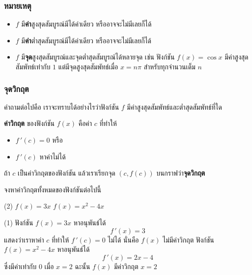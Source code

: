 \begin{frame}
\frametitle{หมายเหตุ}
\begin{remark}{}
\begin{itemize}
\item $f$ มี\textbf{ค่า}สูงสุดสัมบูรณ์มีได้ค่าเดียว หรืออาจจะไม่มีเลยก็ได้
\item $f$ มี\textbf{ค่า}ต่ำสุดสัมบูรณ์มีได้ค่าเดียว หรืออาจจะไม่มีเลยก็ได้
\item $f$ มี\textbf{จุด}สูงสุดสัมบูรณ์และจุดต่ำสุดสัมบูรณ์ได้หลายจุด เช่น ฟังก์ชัน $f(x) = \cos x$ มีค่าสูงสุดสัมพัทธ์เท่ากับ $1$ แต่มีจุดสูงสุดสัมพัทธ์เมื่อ $x = n \pi$ สำหรับทุกจำนวนเต็ม $n$
\end{itemize}
\end{remark}
\end{frame}

\begin{frame}
\end{frame}

\begin{frame}
\frametitle{จุดวิกฤต}
คำถามต่อไปคือ เราจะทราบได้อย่างไรว่าฟังก์ชัน $f$ มีค่าสูงสุดสัมพัทธ์และต่ำสุดสัมพัทธ์ที่ใด
\begin{defn}{}{}
\textbf{ค่าวิกฤต} ของฟังก์ชัน $f(x)$ \pa คือค่า $c$ ที่ทำให้
\begin{itemize}
\item $f\,'(c) = 0$ หรือ \pa 
\item $f\,'(c)$ หาค่าไม่ได้
\end{itemize}
ถ้า $c$ เป็นค่าวิกฤตของฟังก์ชัน แล้วเราเรียกจุด $(c,f(c))$ บนกราฟว่า\textbf{จุดวิกฤต}
\end{defn}
\end{frame}


\begin{frame}[t]
\begin{ex}
จงหาค่าวิกฤตทั้งหมดของฟังก์ชันต่อไปนี้
\begin{tasks}(2)
\task $f(x) = 3x$
\task $f(x) = x^2-4x$
\end{tasks}
\end{ex}
\begin{sol}
\begin{tasks}(1)
\task ฟังก์ชัน $f(x) = 3x$ \pa หาอนุพันธ์ได้ 
\[f\,'(x) = 3\]
\pa แสดงว่าเราหาค่า $c$ ที่ทำให้ $f\,'(c)=0$ ไม่ได้ \pa นั่นคือ $f(x)$ ไม่มีค่าวิกฤต \pa
\task ฟังก์ชัน $f(x) = x^2-4x$ \pa หาอนุพันธ์ได้ 
\[f\,'(x) = 2x-4\] \pa 
ซึ่งมีค่าเท่ากับ $0$ เมื่อ $x=2$ \pa ฉะนั้น $f(x)$ มีค่าวิกฤต $x=2$ \pa
\end{tasks}
\end{sol}
\end{frame}




